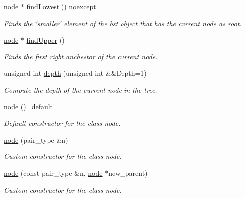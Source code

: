 \begin{DoxyCompactItemize}
\hyperlink{structbst_1_1node}{node} $\ast$ \hyperlink{structbst_1_1node_ae458e2ef45eab2b7ac3d13e361b12e42}{find\+Lowest} () noexcept
\begin{DoxyCompactList}\small\item\em Finds the \char`\"{}smaller\char`\"{} element of the bst object that has the current node as root. \end{DoxyCompactList}\item 
\hyperlink{structbst_1_1node}{node} $\ast$ \hyperlink{structbst_1_1node_a95c26cd3d70b4b8c97506198c1415f94}{find\+Upper} ()
\begin{DoxyCompactList}\small\item\em Finds the first right anchestor of the current node. \end{DoxyCompactList}\item 
unsigned int \hyperlink{structbst_1_1node_ae1809e40838eec567474e483f05a93fb}{depth} (unsigned int \&\&Depth=1)
\begin{DoxyCompactList}\small\item\em Compute the depth of the current node in the tree. \end{DoxyCompactList}\item 
\mbox{\label{structbst_1_1node_a66d903f45fa31e3b8bc7e8bd56003349}} 
\hyperlink{structbst_1_1node_a66d903f45fa31e3b8bc7e8bd56003349}{node} ()=default
\begin{DoxyCompactList}\small\item\em Default constructor for the class node. \end{DoxyCompactList}\item 
\hyperlink{structbst_1_1node_a1e7240e88331831393a987e30e09f69b}{node} (pair\+\_\+type \&n)
\begin{DoxyCompactList}\small\item\em Custom constructor for the class node. \end{DoxyCompactList}\item 
\hyperlink{structbst_1_1node_abd29bdf9f83aedca2dd04264d61624d4}{node} (const pair\+\_\+type \&n, \hyperlink{structbst_1_1node}{node} $\ast$new\+\_\+parent)
\begin{DoxyCompactList}\small\item\em Custom constructor for the class node. \end{DoxyCompactList}\item 
\mbox{\label{structbst_1_1node_a80c9e025d6735588e79d8de5042a8ceb}} 

\end{DoxyCompactItemize}
